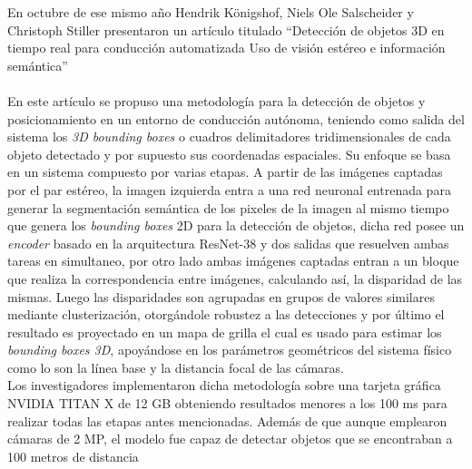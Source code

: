 En octubre de ese mismo año  Hendrik Königshof, Niels Ole Salscheider y Christoph Stiller presentaron un artículo titulado ``Detección de objetos 3D en tiempo real para conducción automatizada
Uso de visión estéreo e información semántica'' \cite{Königshof}
\\
\\ 
En este artículo se propuso una metodología para la detección de objetos y posicionamiento en un entorno de conducción autónoma, teniendo como salida del sistema los \textit{3D bounding boxes} o cuadros delimitadores tridimensionales de cada objeto detectado y por supuesto sus coordenadas espaciales. Su enfoque se basa en un sistema compuesto por varias etapas. A partir de las imágenes captadas por el par estéreo, la imagen izquierda entra a una red neuronal entrenada para generar la segmentación semántica de los pixeles de la imagen al mismo tiempo que genera los \textit{bounding boxes} 2D para la detección de objetos, dicha red posee un \textit{encoder} basado en la arquitectura ResNet-38 y dos salidas que resuelven ambas tareas en simultaneo, por otro lado ambas imágenes captadas entran a un bloque que realiza la correspondencia entre imágenes, calculando así, la disparidad de las mismas. Luego las disparidades son agrupadas en grupos
de valores similares mediante clusterización, otorgándole robustez a las detecciones y por último el resultado es proyectado en un mapa de grilla el cual es usado para estimar los \textit{bounding boxes 3D}, apoyándose en los parámetros geométricos del sistema físico como lo son la línea base y la distancia focal de las cámaras.
\\
Los investigadores implementaron dicha metodología sobre una tarjeta gráfica NVIDIA TITAN X de 12 GB obteniendo resultados menores a los 100 ms para realizar todas las etapas antes mencionadas. Además de que aunque emplearon cámaras de 2 MP, el modelo fue capaz de detectar objetos que se encontraban a 100 metros de distancia